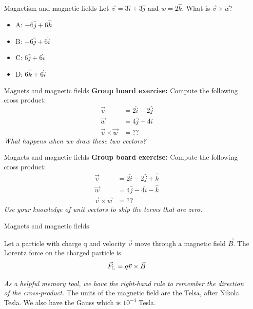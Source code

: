 \documentclass{beamer}
\begin{document}
\begin{frame}{Magnetism and magnetic fields}
Let $\vec{v} = 3\hat{i} + 3\hat{j}$ and $w = 2 \hat{k}$.  What is $\vec{v} \times \vec{w}$?
\begin{itemize}
\item A: $-6 \hat{j} + 6\hat{k}$
\item B: $-6 \hat{j} + 6\hat{i}$
\item C: $6 \hat{j} + 6\hat{i}$
\item D: $6 \hat{k} + 6\hat{i}$
\end{itemize}
\end{frame}

\begin{frame}{Magnets and magnetic fields}
\textbf{Group board exercise:} Compute the following cross product:
\begin{align}
\vec{v} &= 2\hat{i}-2\hat{j} \\
\vec{w} &= 4\hat{j}-4\hat{i} \\
\vec{v} \times \vec{w} &= ??
\end{align}
\textit{What happens when we draw these two vectors?}
\end{frame}

\begin{frame}{Magnets and magnetic fields}
\textbf{Group board exercise:} Compute the following cross product:
\begin{align}
\vec{v} &= 2\hat{i}-2\hat{j}+\hat{k} \\
\vec{w} &= 4\hat{j}-4\hat{i}-\hat{k} \\
\vec{v} \times \vec{w} &= ??
\end{align}
\textit{Use your knowledge of unit vectors to skip the terms that are zero.}
\end{frame}

\begin{frame}{Magnets and magnetic fields}
\begin{tcolorbox}[colback=white,colframe=black!40!black,title=The Lorentz Force]
\alert{Let a particle with charge q and velocity $\vec{v}$ move through a magnetic field $\vec{B}$. The Lorentz force on the charged particle is
\begin{equation}
\vec{F}_{\rm L} = q\vec{v} \times \vec{B}
\label{eq:Lorentz}
\end{equation}}
\end{tcolorbox}
\textit{As a helpful memory tool, we have the right-hand rule to
remember the direction of the cross-product.} The units of the
magnetic field are the Telsa, after Nikola Tesla. We also have
the Gauss which is $10^{-4}$ Tesla.
\end{frame}
\end{document}
